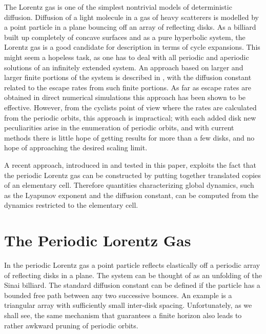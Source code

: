 The Lorentz gas is one of the simplest nontrivial models
of deterministic diffusion.
Diffusion of a light molecule in a gas of heavy scatterers
is modelled
by a point particle in a plane bouncing off an array of reflecting disks.
As a billiard built up completely of
concave surfaces and as a pure hyperbolic system, the
Lorentz gas is a good candidate for description in terms of cycle
expansions.
This might seem a hopeless task, as one
has to deal with all periodic and aperiodic
solutions of an infinitely extended system. An
approach based on larger and larger finite portions of the system is described
in , with the diffusion constant related to
the escape rates from such finite portions.
As far as escape rates are obtained in direct numerical simulations
this approach has been shown to be effective.
However, from the cyclists point of view
where the rates are calculated from the periodic orbits,
this approach is impractical; with each added disk new peculiarities arise
in the enumeration of periodic orbits, and with current
methods there is little hope of getting results for more than a few disks,
and no hope of approaching the desired scaling limit.

A recent approach, introduced in  and
tested in this paper, exploits the fact that the periodic Lorentz
gas
can be constructed by putting together
translated copies of an elementary cell.
Therefore quantities characterizing global dynamics, such as
the Lyapunov exponent and the diffusion constant, can be
computed from the dynamics restricted to the elementary cell.

\section{The Periodic Lorentz Gas}
In the periodic Lorentz gas
a point particle reflects elastically off
a periodic array of reflecting disks in a plane.
The system can
be thought of as an unfolding of the Sinai billiard.
The standard diffusion constant can be defined if the particle has a bounded
free path between any two successive bounces.
An example is a triangular array with sufficiently small
inter-disk spacing.
Unfortunately, as we shall see,
the same mechanism that guarantees a finite horizon
also leads to rather awkward pruning of periodic orbits.


